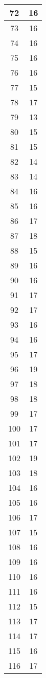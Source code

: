 \documentclass[letterpaper, 12pt]{article}
\begin{document}
\begin{longtable}{|c|c|}
\hline
72 & 16 \\
\hline
73 & 16 \\
\hline
74 & 16 \\
\hline
75 & 16 \\
\hline
76 & 16 \\
\hline
77 & 15 \\
\hline
78 & 17 \\
\hline
79 & 13 \\
\hline
80 & 15 \\
\hline
81 & 15 \\
\hline
82 & 14 \\
\hline
83 & 14 \\
\hline
84 & 16 \\
\hline
85 & 16 \\
\hline
86 & 17 \\
\hline
87 & 18 \\
\hline
88 & 15 \\
\hline
89 & 16 \\
\hline
90 & 16 \\
\hline
91 & 17 \\
\hline
92 & 17 \\
\hline
93 & 16 \\
\hline
94 & 16 \\
\hline
95 & 17 \\
\hline
96 & 19 \\
\hline
97 & 18 \\
\hline
98 & 18 \\
\hline
99 & 17 \\
\hline
100 & 17 \\
\hline
101 & 17 \\
\hline
102 & 19 \\
\hline
103 & 18 \\
\hline
104 & 16 \\
\hline
105 & 16 \\
\hline
106 & 17 \\
\hline
107 & 15 \\
\hline
108 & 16 \\
\hline
109 & 16 \\
\hline
110 & 16 \\
\hline
111 & 16 \\
\hline
112 & 15 \\
\hline
113 & 17 \\
\hline
114 & 17 \\
\hline
115 & 16 \\
\hline
116 & 17 \\

\end{longtable}
\end{document}
